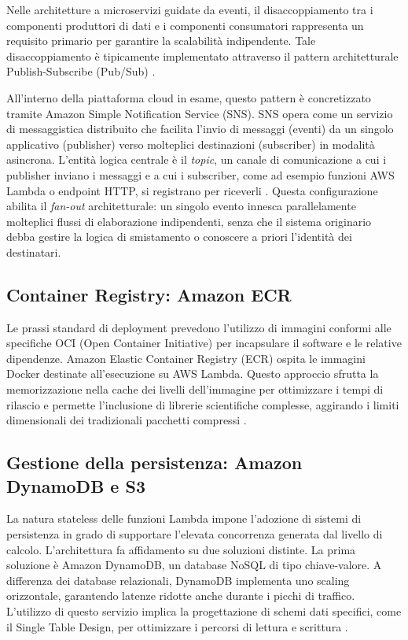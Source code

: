 Nelle architetture a microservizi guidate da eventi, il disaccoppiamento tra i componenti produttori di dati e i componenti consumatori rappresenta un requisito primario per garantire la scalabilità indipendente. Tale disaccoppiamento è tipicamente implementato attraverso il pattern architetturale Publish-Subscribe (Pub/Sub) \cite{PubSubPattern}.

All'interno della piattaforma cloud in esame, questo pattern è concretizzato tramite Amazon Simple Notification Service (SNS). SNS opera come un servizio di messaggistica distribuito che facilita l'invio di messaggi (eventi) da un singolo applicativo (publisher) verso molteplici destinazioni (subscriber) in modalità asincrona. L'entità logica centrale è il \emph{topic}, un canale di comunicazione a cui i publisher inviano i messaggi e a cui i subscriber, come ad esempio funzioni AWS Lambda o endpoint HTTP, si registrano per riceverli \cite{SNS}. Questa configurazione abilita il \emph{fan-out} architetturale: un singolo evento innesca parallelamente molteplici flussi di elaborazione indipendenti, senza che il sistema originario debba gestire la logica di smistamento o conoscere a priori l'identità dei destinatari.

\subsection{Container Registry: Amazon ECR}
Le prassi standard di deployment prevedono l'utilizzo di immagini conformi alle specifiche OCI (Open Container Initiative) per incapsulare il software e le relative dipendenze. Amazon Elastic Container Registry (ECR) ospita le immagini Docker destinate all'esecuzione su AWS Lambda. Questo approccio sfrutta la memorizzazione nella cache dei livelli dell'immagine per ottimizzare i tempi di rilascio e permette l'inclusione di librerie scientifiche complesse, aggirando i limiti dimensionali dei tradizionali pacchetti compressi \cite{ECR}.

\subsection{Gestione della persistenza: Amazon DynamoDB e S3}
La natura stateless delle funzioni Lambda impone l'adozione di sistemi di persistenza in grado di supportare l'elevata concorrenza generata dal livello di calcolo. L'architettura fa affidamento su due soluzioni distinte.
La prima soluzione è Amazon DynamoDB, un database NoSQL di tipo chiave-valore. A differenza dei database relazionali, DynamoDB implementa uno scaling orizzontale, garantendo latenze ridotte anche durante i picchi di traffico. L'utilizzo di questo servizio implica la progettazione di schemi dati specifici, come il Single Table Design, per ottimizzare i percorsi di lettura e scrittura \cite{DynamoDBPaper}.


